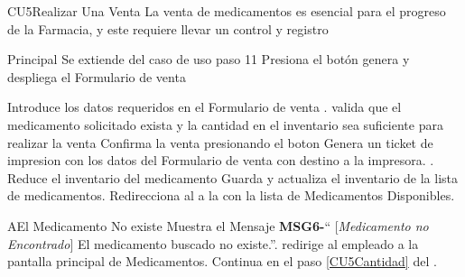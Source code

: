 \begin{UseCase}{CU5}{Realizar Una Venta}{
		La venta de medicamentos es esencial para el progreso de la Farmacia, y este requiere llevar un control y registro 
	}
	\end{UseCase}
	\begin{UCtrayectoria}{Principal}
		\UCpaso Se extiende del caso de uso  paso 11
		\UCpaso [\UCactor] Presiona el botón 
		\UCpaso genera y despliega el Formulario de venta
		
		\UCpaso[\UCactor] Introduce los datos requeridos en el Formulario de venta .
		\UCpaso valida que el medicamento solicitado exista y la cantidad en el inventario sea suficiente para realizar la venta   \label{CU5Cantidad}
		\UCpaso[\UCactor] Confirma la venta presionando el boton 
		\UCpaso Genera un ticket de impresion con los datos del Formulario de venta  con destino a la impresora. \label{CU5Imp}.
		\UCpaso Reduce el inventario del medicamento 
	           \UCpaso Guarda y actualiza  el inventario de la lista de medicamentos.
		\UCpaso Redirecciona al \UCactor a la   con la lista de Medicamentos Disponibles.
	\end{UCtrayectoria}

		 \begin{UCtrayectoriaA}{A}{El Medicamento No existe}
			\UCpaso Muestra el Mensaje {\bf MSG6-}`` [{\em Medicamento no Encontrado}] El  medicamento buscado no existe.''.
			\UCpaso   redirige al empleado a la pantalla principal de Medicamentos.
			\UCpaso Continua en el paso \ref{CU5Cantidad} del .
		\end{UCtrayectoriaA}

